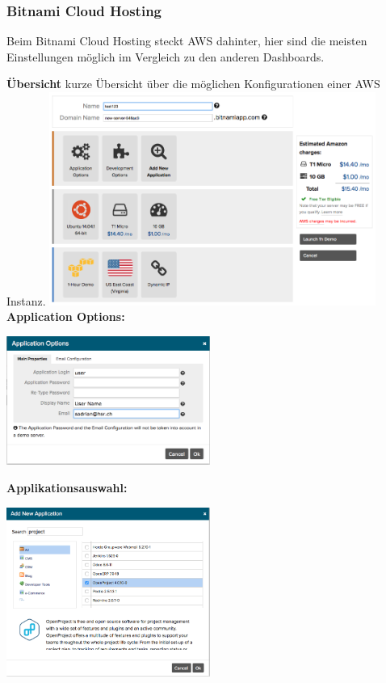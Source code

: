 \subsubsection{Bitnami Cloud Hosting}
Beim Bitnami Cloud Hosting steckt AWS dahinter, hier sind die meisten 
Einstellungen möglich im Vergleich zu den anderen Dashboards.


\textbf{Übersicht}
kurze Übersicht über die möglichen Konfigurationen einer AWS Instanz.
\includegraphics[width=0.8\textwidth]{./03_Analyse/03_Bitnami/images/aws_overview}
\newpage
\textbf{Application Options:}

\includegraphics[width=0.5\textwidth]{./03_Analyse/03_Bitnami/images/aws_application_options}

\textbf{Applikationsauswahl:}

\includegraphics[width=0.5\textwidth]{./03_Analyse/03_Bitnami/images/aws_add_application}

